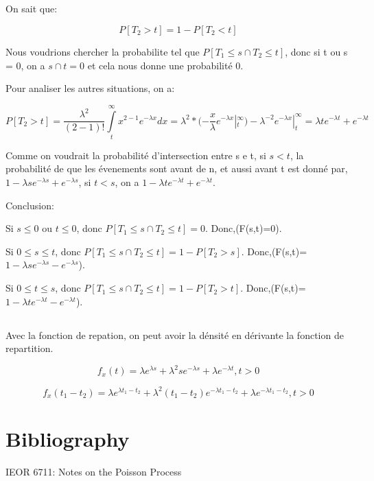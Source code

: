 \documentclass[a4paper]{article}
\begin{document}
\subsection{}

On sait que:

\begin{equation}
P[T_2 > t] =1 - P[T_2 < t]
\end{equation}

Nous voudrions  chercher la probabilite tel  que $P[T_1\leq s  \cap T_2\leq t]$,
donc si t ou s = 0, on a $s \cap t = 0$ et cela nous donne une probabilité 0.

Pour analiser les autres situations, on a:

\begin{equation}
P[T_2 > t] = \frac{\lambda ^2}{(2 - 1)!}\int\limits_t^\infty{x^{2-1}}e^{-\lambda x}dx= \lambda ^2 *(-\frac{x}{\lambda} e^{-\lambda x} |_t^\infty)- \lambda^{-2} e^{-\lambda x}|_t^\infty = \lambda te^{-\lambda t} + e^{-\lambda t}
\end{equation}

Comme  on voudrait  la probabilité  d'intersection  entre s  e t,  si $s<t$,  la
probabilité de que  les évenements sont avant  de n, et aussi avant  t est donné
par, $1 - \lambda se^{-\lambda s} + e^{-\lambda s}$, si $t<s$, on a 
$1 - \lambda te^{-\lambda t} + e^{-\lambda t}$.



Conclusion: 

Si $s \leq 0$ ou $t \leq 0$, donc $P[{T_1 \leq s} \cap {T_2 \leq t}]=0$. Donc,(F(s,t)=0).

Si $0 \leq s \leq t $, donc $P[{T_1 \leq s} \cap {T_2 \leq t}]=1-P[T_2 > s]$. Donc,(F(s,t)=$1 - \lambda se^{-\lambda s} - e^{-\lambda s}$).

Si $0 \leq t \leq s $, donc $P[{T_1 \leq s} \cap {T_2 \leq t}]=1-P[T_2 > t]$. Donc,(F(s,t)=$1 - \lambda te^{-\lambda t} - e^{-\lambda t}$).


\subsection{}
Avec la fonction de repation, on  peut avoir la dénsité en dérivante la fonction
de repartition. 

\begin{equation}
f_x(t) = \lambda e^{\lambda s}+\lambda ^2se^{-\lambda s}+\lambda e^{-\lambda t} , t>0
\end{equation}

\begin{equation}
f_x(t_1-t_2) = \lambda e^{\lambda t_1-t_2}+\lambda ^2(t_1-t_2)e^{-\lambda t_1-t_2}+\lambda e^{-\lambda t_1-t_2} , t>0
\end{equation}


\section{Bibliography}

IEOR 6711: Notes on the Poisson Process
\end{document}
